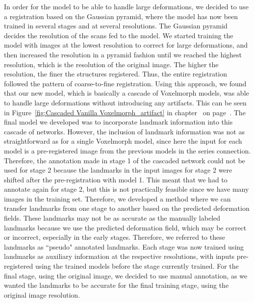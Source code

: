 \documentclass{book}
\begin{document}
	In order for the model to be able to handle large deformations, we decided to use a registration based on the Gaussian pyramid, where the model has now been trained in several stages and at several resolutions. The Gaussian pyramid decides the resolution of the scans fed to the model. We started training the model with images at the lowest resolution to correct for large deformations, and then increased the resolution in a pyramid fashion until we reached the highest resolution, which is the resolution of the original image. The higher the resolution, the finer the structures registered. Thus, the entire registration followed the pattern of coarse-to-fine registration. Using this approach, we found that our new model, which is basically a cascade of Voxelmorph models, was able to handle large deformations without introducing any artifacts. This can be seen in Figure~\ref{fig:Cascaded Vanilla Voxelmorph_artifact} in chapter~ on page~\pageref{fig:Cascaded Vanilla Voxelmorph_artifact}. The final model we developed was to incorporate landmark information into this cascade of networks. However, the inclusion of landmark information was not as straightforward as for a single Voxelmorph model, since here the input for each model is a pre-registered image from the previous models in the series connection. Therefore, the annotation made in stage 1 of the cascaded network could not be used for stage 2 because the landmarks in the input images for stage 2 were shifted after the pre-registration with model 1. This meant that we had to annotate again for stage 2, but this is not practically feasible since we have many images in the training set. Therefore, we developed a method where we can transfer landmarks from one stage to another based on the predicted deformation fields. These landmarks may not be as accurate as the manually labeled landmarks because we use the predicted deformation field, which may be correct or incorrect, especially in the early stages. Therefore, we referred to these landmarks as ``pseudo" annotated landmarks. Each stage was now trained using landmarks as auxiliary information at the respective resolutions, with inputs pre-registered using the trained models before the stage currently trained. For the final stage, using the original image, we decided to use manual annotation, as we wanted the landmarks to be accurate for the final training stage, using the original image resolution.
	
\end{document}

